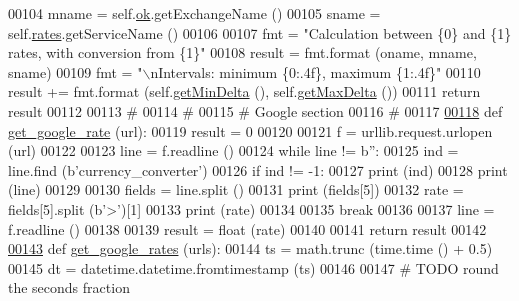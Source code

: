 \begin{DoxyCode}
00104         mname = self.\hyperlink{classraw__urlparser_1_1_differences_a46fe97bedb977585a0b27d7408ace118}{ok}.getExchangeName ()
00105         sname = self.\hyperlink{classraw__urlparser_1_1_differences_ad4e7eadb659a1cdcba90793cc52af174}{rates}.getServiceName ()
00106         
00107         fmt = \textcolor{stringliteral}{"Calculation between \{0\} and \{1\} rates, with conversion from \{1\}"}
00108         result = fmt.format (oname, mname, sname)
00109         fmt = \textcolor{stringliteral}{"\(\backslash\)nIntervals: minimum \{0:.4f\}, maximum \{1:.4f\}"}
00110         result += fmt.format (self.\hyperlink{classraw__urlparser_1_1_differences_af19faaea85ca8ac0d327c8443ddd99ef}{getMinDelta} (), self.\hyperlink{classraw__urlparser_1_1_differences_acfa09d743c08cc813a5bc435aa6875da}{getMaxDelta} ())
00111         \textcolor{keywordflow}{return} result
00112 
00113 \textcolor{comment}{#        }
00114 \textcolor{comment}{# }
00115 \textcolor{comment}{# Google section }
00116 \textcolor{comment}{#}
00117 
\hyperlink{namespaceraw__urlparser_a4faaced9140d84b3f953c21eb1c4a19d}{00118} \textcolor{keyword}{def }\hyperlink{namespaceraw__urlparser_a4faaced9140d84b3f953c21eb1c4a19d}{get\_google\_rate} (url):
00119     result = 0
00120 
00121     f = urllib.request.urlopen (url)
00122     
00123     line = f.readline ()
00124     \textcolor{keywordflow}{while} line != b\textcolor{stringliteral}{''}:
00125         ind = line.find (b\textcolor{stringliteral}{'currency\_converter'})
00126         \textcolor{keywordflow}{if} ind != -1:
00127             \textcolor{keywordflow}{print} (ind)
00128             \textcolor{keywordflow}{print} (line)
00129             
00130             fields = line.split ()
00131             \textcolor{keywordflow}{print} (fields[5])
00132             rate = fields[5].split (b\textcolor{stringliteral}{'>'})[1]
00133             \textcolor{keywordflow}{print} (rate)
00134             
00135             \textcolor{keywordflow}{break}
00136             
00137         line = f.readline ()
00138     
00139     result = float (rate)
00140     
00141     \textcolor{keywordflow}{return} result
00142     
\hyperlink{namespaceraw__urlparser_aa5905f1b040de4865980526ac3c6a16c}{00143} \textcolor{keyword}{def }\hyperlink{namespaceraw__urlparser_aa5905f1b040de4865980526ac3c6a16c}{get\_google\_rates} (urls):
00144     ts = math.trunc (time.time () + 0.5)
00145     dt = datetime.datetime.fromtimestamp (ts)
00146     
00147     \textcolor{comment}{# TODO round the seconds fraction}

\end{DoxyCode}
